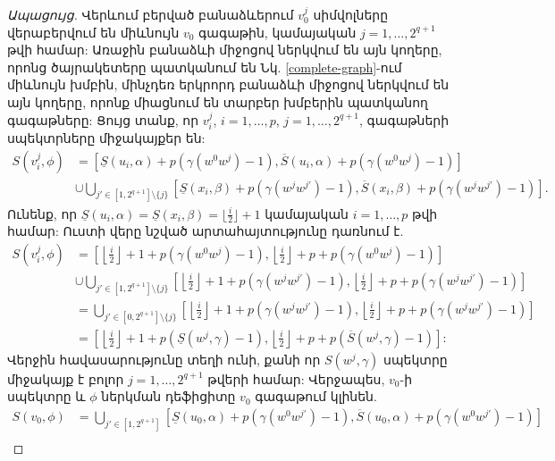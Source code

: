 \begin{proof}[Ապացույց]
Վերևում բերված բանաձևերում $v_0^j$ սիմվոլները վերաբերվում են միևնույն $v_0$ գագաթին, %
կամայական $j=1,\ldots,2^{q+1}$ թվի համար: %
Առաջին բանաձևի միջոցով ներկվում են այն կողերը, որոնց ծայրակետերը պատկանում են Նկ. \ref{complete-graph}-ում միևնույն խմբին, մինչդեռ երկրորդ բանաձևի միջոցով ներկվում են այն կողերը, որոնք միացնում են տարբեր խմբերին պատկանող գագաթները: Ցույց տանք, որ $v_i^j$, $i=1,\ldots,p$, $j=1,\ldots,2^{q+1}$, գագաթների սպեկտրները միջակայքեր են:
\begin{align*}
    S\left(v^j_i,\phi\right) &= \left[\underline{S}(u_i, \alpha) + p\left(\gamma(w^0w^j) - 1\right), \overline{S}(u_i, \alpha) + p\left(\gamma(w^0w^j) - 1\right)\right] \\
    &\cup \bigcup\limits_{j'\in [1, 2^{q+1}] \setminus \{j\}}{\left[\underline{S}(x_i, \beta) + p\left(\gamma(w^jw^{j'}) - 1\right), \overline{S}(x_i, \beta) + p\left(\gamma(w^jw^{j'}) - 1\right) \right]}.
\end{align*}
Ունենք, որ $\underline{S}(u_i, \alpha) = \underline{S}(x_i, \beta) = \lfloor \frac{i}{2} \rfloor + 1$ կամայական $i = 1,\ldots,p$ թվի համար: %
Ուստի վերը նշված արտահայտությունը դառնում է.
\begin{align*}
    S\left(v^j_i,\phi\right) &= \left[\left\lfloor \frac{i}{2} \right\rfloor + 1 + p\left(\gamma(w^0w^j) - 1\right), \left\lfloor \frac{i}{2} \right\rfloor + p + p\left(\gamma(w^0w^j) - 1\right)\right] \\
    &\cup \bigcup\limits_{j'\in [1, 2^{q+1}] \setminus \{j\}}{\left[\left\lfloor \frac{i}{2} \right\rfloor + 1 + p\left(\gamma(w^jw^{j'}) - 1\right), \left\lfloor \frac{i}{2} \right\rfloor + p + p\left(\gamma(w^jw^{j'}) - 1\right) \right]}\\
    &= \bigcup\limits_{j'\in [0, 2^{q+1}] \setminus \{j\}}{\left[\left\lfloor \frac{i}{2} \right\rfloor + 1 + p\left(\gamma(w^jw^{j'}) - 1\right), \left\lfloor \frac{i}{2} \right\rfloor + p + p\left(\gamma(w^jw^{j'}) - 1\right) \right]}\\
    &= \left[\left\lfloor \frac{i}{2} \right\rfloor + 1 + p\left(\underline{S}(w^j,\gamma) - 1\right), \left\lfloor \frac{i}{2} \right\rfloor + p + p\left(\overline{S}(w^j,\gamma) - 1\right) \right]:
\end{align*}
Վերջին հավասարությունը տեղի ունի, քանի որ $S\left(w^j, \gamma\right)$ սպեկտրը միջակայք է բոլոր $j=1,\ldots,2^{q+1}$ թվերի համար: Վերջապես, $v_0$-ի սպեկտրը և $\phi$ ներկման դեֆիցիտը $v_0$ գագաթում կլինեն.
\begin{align*}
    S\left(v_0,\phi\right) &= \bigcup\limits_{j'\in [1, 2^{q+1}]} {\left[ \underline{S}(u_0, \alpha) + p\left(\gamma(w^0w^{j'}) - 1\right), \overline{S}(u_0, \alpha) + p\left(\gamma(w^0w^{j'}) - 1\right) \right]}\\

\end{align*}
\end{proof}
